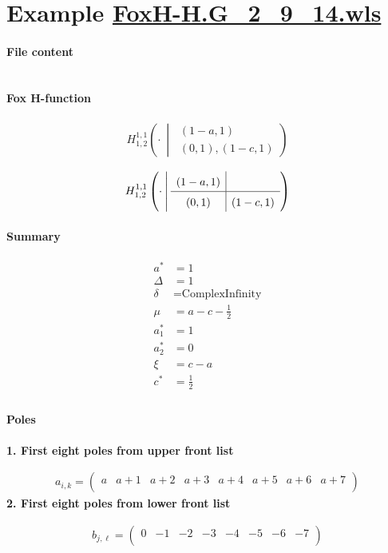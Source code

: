 \documentclass[11pt]{article}
\newcommand{\FoxH}[5]{H_{#2}^{#1}\left(#3\:\middle\vert\: \begin{array}{l}#4\\[0.4em] #5\end{array}\right)}
\begin{document}
\section{Example \url{FoxH-H.G_2_9_14.wls}}

\paragraph{File content}

\inputminted{text}{FoxH-H.G_2_9_14.wls}

\paragraph{Fox H-function}

\begin{align*}
  \FoxH
    {1,1}
    {1,2}
    {\cdot}
    {\left(1-a, 1\right)}
    {\left(0, 1\right), \left(1-c, 1\right)}
\end{align*}

\begin{align*}
  \FoxHext
    {1,1}
    {1,2}
    {\cdot}
    {\left(1-a, 1\right)}
    {}
    {\left(0, 1\right)}
    {\left(1-c, 1\right)}
\end{align*}

\paragraph{Summary}

\begin{align*}
  a^*    & = 1 \\
  \Delta & = 1 \\
  \delta & = \text{ComplexInfinity} \\
  \mu    & = a-c-\frac{1}{2} \\
  a_1^*  & = 1 \\
  a_2^*  & = 0 \\
  \xi    & = c-a \\
  c^*    & = \frac{1}{2} \\
\end{align*}

\paragraph{Poles}

\noindent\textbf{1. First eight poles from upper front list}

\begin{align*}
  a_{i,k} = 
  \left(
\begin{array}{cccccccc}
 a & a+1 & a+2 & a+3 & a+4 & a+5 & a+6 & a+7 \\
\end{array}
\right)
\end{align*}
\noindent\textbf{2. First eight poles from lower front list}

\begin{align*}
  b_{j,\ell} = 
  \left(
\begin{array}{cccccccc}
 0 & -1 & -2 & -3 & -4 & -5 & -6 & -7 \\
\end{array}
\right)
\end{align*}

\printbibliography[title={References}]
\end{document}
